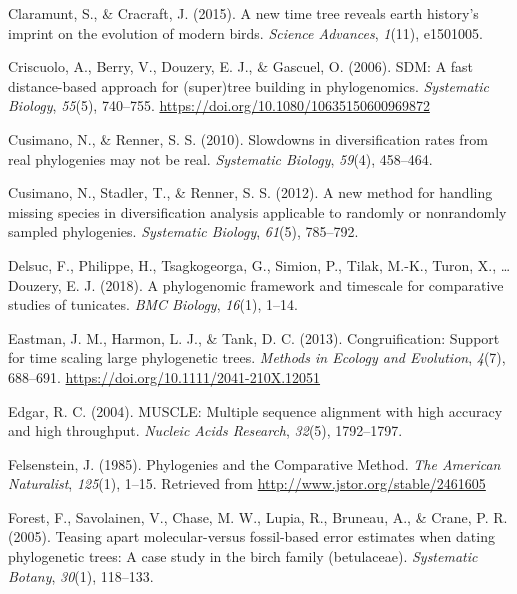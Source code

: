 \documentclass[english,man]{apa6}
\begin{document}
\leavevmode\hypertarget{ref-claramunt2015new}{}%
Claramunt, S., \& Cracraft, J. (2015). A new time tree reveals earth history's imprint on the evolution of modern birds. \emph{Science Advances}, \emph{1}(11), e1501005.

\leavevmode\hypertarget{ref-Criscuolo2006}{}%
Criscuolo, A., Berry, V., Douzery, E. J., \& Gascuel, O. (2006). SDM: A fast distance-based approach for (super)tree building in phylogenomics. \emph{Systematic Biology}, \emph{55}(5), 740--755. \url{https://doi.org/10.1080/10635150600969872}

\leavevmode\hypertarget{ref-cusimano2010slowdowns}{}%
Cusimano, N., \& Renner, S. S. (2010). Slowdowns in diversification rates from real phylogenies may not be real. \emph{Systematic Biology}, \emph{59}(4), 458--464.

\leavevmode\hypertarget{ref-cusimano2012new}{}%
Cusimano, N., Stadler, T., \& Renner, S. S. (2012). A new method for handling missing species in diversification analysis applicable to randomly or nonrandomly sampled phylogenies. \emph{Systematic Biology}, \emph{61}(5), 785--792.

\leavevmode\hypertarget{ref-delsuc2018phylogenomic}{}%
Delsuc, F., Philippe, H., Tsagkogeorga, G., Simion, P., Tilak, M.-K., Turon, X., \ldots{} Douzery, E. J. (2018). A phylogenomic framework and timescale for comparative studies of tunicates. \emph{BMC Biology}, \emph{16}(1), 1--14.

\leavevmode\hypertarget{ref-Eastman2013}{}%
Eastman, J. M., Harmon, L. J., \& Tank, D. C. (2013). Congruification: Support for time scaling large phylogenetic trees. \emph{Methods in Ecology and Evolution}, \emph{4}(7), 688--691. \url{https://doi.org/10.1111/2041-210X.12051}

\leavevmode\hypertarget{ref-edgar2004muscle}{}%
Edgar, R. C. (2004). MUSCLE: Multiple sequence alignment with high accuracy and high throughput. \emph{Nucleic Acids Research}, \emph{32}(5), 1792--1797.

\leavevmode\hypertarget{ref-Felsenstein1985a}{}%
Felsenstein, J. (1985). Phylogenies and the Comparative Method. \emph{The American Naturalist}, \emph{125}(1), 1--15. Retrieved from \url{http://www.jstor.org/stable/2461605}

\leavevmode\hypertarget{ref-forest2005teasing}{}%
Forest, F., Savolainen, V., Chase, M. W., Lupia, R., Bruneau, A., \& Crane, P. R. (2005). Teasing apart molecular-versus fossil-based error estimates when dating phylogenetic trees: A case study in the birch family (betulaceae). \emph{Systematic Botany}, \emph{30}(1), 118--133.
\end{document}
